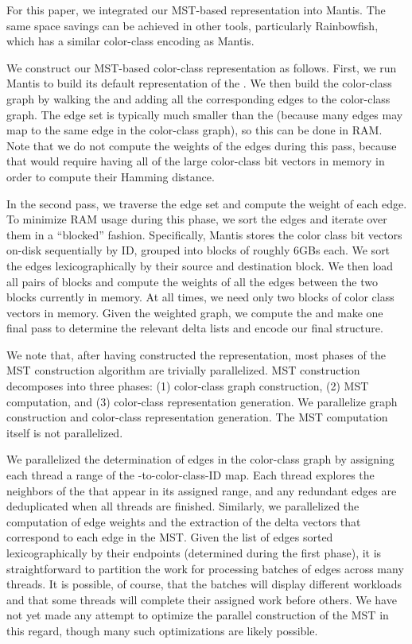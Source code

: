 For this paper, we integrated our MST-based representation into
Mantis.  The same space savings can be achieved in
other tools, particularly Rainbowfish, which has
a similar color-class encoding as Mantis.

We construct our MST-based color-class representation as follows.
First, we run Mantis to build its default representation of the \cdbg.
We then build the color-class graph by walking the \dbg and adding all
the corresponding edges to the color-class graph.  The edge set is
typically much smaller than the \dbg (because many \dbg edges may map to
the same edge in the color-class graph), so this can be done in RAM.
Note that we do not compute the weights of the edges during this pass,
because that would require having all of the large color-class bit vectors
in memory in order to compute their Hamming distance.

In the second pass, we traverse the edge set and compute the weight of
each edge.  To minimize RAM usage during this phase, we sort
the edges and iterate over them in a ``blocked'' fashion.
Specifically, Mantis stores the color class bit vectors on-disk
sequentially by ID, grouped into blocks of roughly 6GBs each.  We sort
the edges lexicographically by their source and destination block. We then load
all pairs of blocks and compute the weights of all the edges between the two
blocks currently in memory. At all times, we need only two blocks of color class
vectors in memory. Given the weighted graph, we compute the \mst and make one
final pass to determine the relevant delta lists and encode our final \mst
structure.

  We note that, after having
constructed the \mantis representation, most phases of the MST
construction algorithm are trivially parallelized.  MST construction
decomposes into three phases: (1) color-class graph construction, (2)
MST computation, and (3) color-class representation generation.
We parallelize graph construction and color-class representation
generation. The MST computation itself is not parallelized.

We parallelized the determination of edges in the color-class graph by
assigning each thread a range of the \kmer-to-color-class-ID
map. Each thread explores the neighbors of the \kmers that appear in
its assigned range, and any redundant edges are deduplicated when all
threads are finished.  Similarly, we parallelized the computation of
edge weights and the extraction of the delta vectors that correspond
to each edge in the MST. Given the list of edges sorted
lexicographically by their endpoints (determined during the first
phase), it is straightforward to partition the work for processing
batches of edges across many threads. It is possible, of course, that
the batches will display different workloads and that some threads
will complete their assigned work before others.  We have not yet made
any attempt to optimize the parallel construction of the MST in this
regard, though many such optimizations are likely possible.

